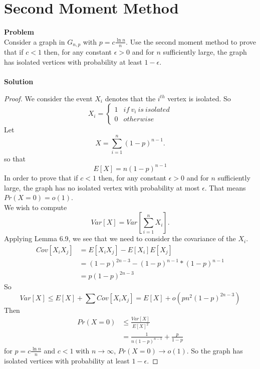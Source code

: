 	\section{Second Moment Method}
	\textbf{Problem}\\
	Consider a graph in $G_{n,p}$ with $p = c\frac{\ln{n}}{n}$. Use the second moment method to prove that if $c < 1$ then, for any constant $\epsilon > 0$ and for $n$ sufficiently large, the graph has isolated vertices with probability at least $1-\epsilon$.\\\\
	\textbf{Solution}\\
	\begin{proof}
		We consider the event $X_i$ denotes that the $i^{th}$ vertex is isolated. So
	\begin{equation*}
		X_i = \left \{ \begin{array}{ll}
			1 & if\ v_i\ is\ isolated \\
			0 & otherwise
		\end{array}
		\right.
	\end{equation*}
	Let
	\begin{equation*}
		X = \sum_{i=1}^{n} (1-p)^{n-1}.
	\end{equation*}
	so that
	\begin{equation*}
		E[X] = n (1-p)^{n-1}
	\end{equation*}
	In order to prove that if $c < 1$ then, for any constant $\epsilon > 0$ and for $n$ sufficiently large, the graph has no isolated vertex with probability at most $\epsilon$. That means $Pr(X=0)=o(1)$.\\
	We wish to compute
	\begin{equation*}
		Var[X] = Var\left[\sum_{i=1}^{n} X_i\right].
	\end{equation*}
	Applying Lemma 6.9, we see that we need to consider the covariance of the $X_i$.
	\begin{equation*}
		\begin{split}
			Cov[X_iX_j] &= E[X_iX_j]-E[X_i]E[X_j]\\
			&= (1-p)^{2n-3} - (1-p)^{n-1}*(1-p)^{n-1}\\
			&= p(1-p)^{2n-3}
		\end{split}
	\end{equation*}
	So
	\begin{equation*}
		Var[X] \le E[X] + \sum Cov[X_iX_j] = E[X] + o(pn^2(1-p)^{2n-3})
	\end{equation*}
	Then
	\begin{equation*}
		\begin{split}
			Pr(X=0) &\le \frac{Var[X]}{E[X]^2}\\
			&=\frac{1}{n (1-p)^{n-1}} + \frac{p}{1-p}
		\end{split}
	\end{equation*}
	for $p = c\frac{\ln{n}}{n}$ and $c<1$ with $n \to \infty$, $Pr(X=0) \to o(1)$. So the graph has isolated vertices with probability at least $1-\epsilon$.
	\end{proof}
	
